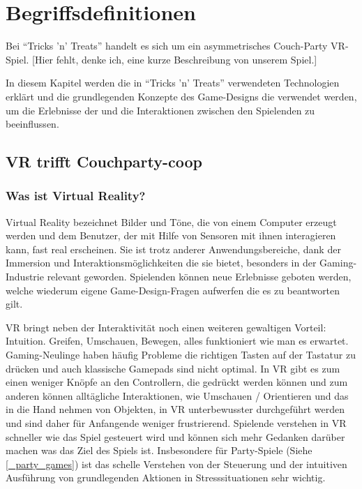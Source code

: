 \chapter{Begriffsdefinitionen}

Bei "`Tricks 'n' Treats"' handelt es sich um ein asymmetrisches Couch-Party VR-Spiel. [Hier fehlt, denke ich, eine kurze Beschreibung von unserem Spiel.]

In diesem Kapitel werden die in "`Tricks 'n' Treats"' verwendeten Technologien erklärt und die grundlegenden Konzepte des Game-Designs die verwendet werden, um die  Erlebnisse der und die Interaktionen zwischen den Spielenden zu beeinflussen.

\section{VR trifft Couchparty-coop}

\subsection{Was ist Virtual Reality?}

Virtual Reality bezeichnet Bilder und Töne, die von einem Computer erzeugt werden und dem Benutzer, der mit Hilfe von Sensoren mit ihnen interagieren kann, fast real erscheinen\cite{_oxford_dict}. Sie ist trotz anderer Anwendungsbereiche, dank der Immersion und Interaktionsmöglichkeiten die sie bietet, besonders in der Gaming-Industrie relevant geworden\cite{_bitkom_vr}. Spielenden können neue Erlebnisse geboten werden, welche wiederum eigene Game-Design-Fragen aufwerfen die es zu beantworten gilt.

VR bringt neben der Interaktivität noch einen weiteren gewaltigen Vorteil: Intuition. Greifen, Umschauen, Bewegen, alles funktioniert wie man es erwartet. Gaming-Neulinge haben häufig Probleme die richtigen Tasten auf der Tastatur zu drücken und auch klassische Gamepads sind nicht optimal. In VR gibt es zum einen weniger Knöpfe an den Controllern, die gedrückt werden können und zum anderen können alltägliche Interaktionen, wie Umschauen / Orientieren und das in die Hand nehmen von Objekten, in VR unterbewusster durchgeführt werden und sind daher für Anfangende weniger frustrierend. Spielende verstehen in VR schneller wie das Spiel gesteuert wird und können sich mehr Gedanken darüber machen was das Ziel des Spiels ist\cite{_natural_interaction_in__augmented_reality_context}. Insbesondere für Party-Spiele (Siehe \ref{_party_games}) ist das schelle Verstehen von der Steuerung und der intuitiven Ausführung von grundlegenden Aktionen in Stresssituationen sehr wichtig.


